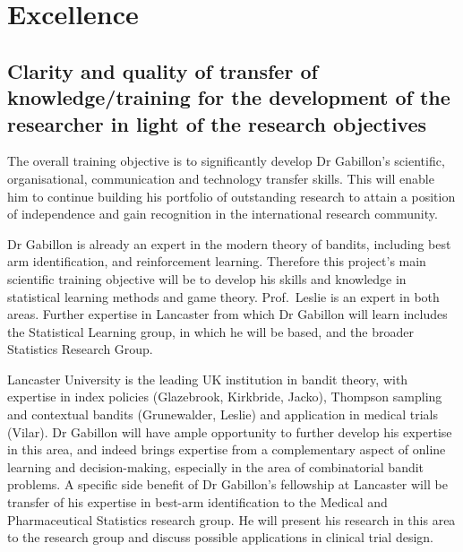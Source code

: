 \documentclass[a4paper,11pt]{article}
\renewcommand{\cite}{\autocite} %
\begin{document}
\newpage

\section{Excellence}
\label{sec:excellence}






\subsection{Clarity and quality of transfer of knowledge/training for the development of the researcher in light of the research objectives}
\label{sec:transfer}


The overall training objective is to significantly develop Dr Gabillon's scientific, organisational, communication and technology transfer skills.  This will enable him to continue building his portfolio of outstanding research to attain a position of independence and gain recognition in the international research community.

Dr Gabillon is already an expert in the modern theory of bandits, including best arm identification, and reinforcement learning.  Therefore this project's main scientific training objective will be to develop his skills and knowledge in statistical learning methods and game theory.  Prof.\ Leslie is an expert in both areas.  Further expertise in Lancaster from which Dr Gabillon will learn includes the Statistical Learning group, in which he will be based, and the broader Statistics Research Group.

Lancaster University is the leading UK institution in bandit theory, with expertise in index policies (Glazebrook, Kirkbride, Jacko), Thompson sampling and contextual bandits (Grunewalder, Leslie) and application in medical trials (Vilar). Dr Gabillon will have ample opportunity to further develop his expertise in this area, and indeed brings expertise from a complementary aspect of online learning and decision-making, especially in the area of combinatorial bandit problems.   A specific side benefit of Dr Gabillon's fellowship at Lancaster will be transfer of his expertise in best-arm identification to the Medical and Pharmaceutical Statistics research group.  He will present his research in this area to the research group and discuss possible applications in clinical trial design.%
\end{document}
